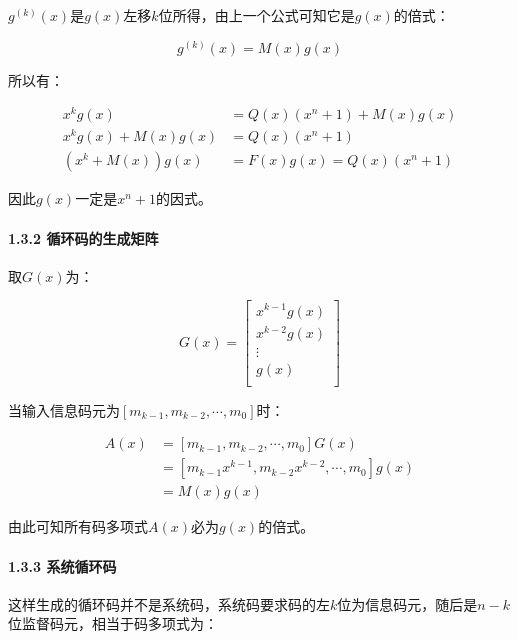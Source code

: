 \documentclass[
]{article}
\begin{document}
$g^{(k)}(x)$是$g(x)$左移$k$位所得，由上一个公式可知它是$g(x)$的倍式：

\begin{equation}
g^{(k)}(x)=M(x)g(x)
\end{equation}

所以有：

\begin{equation}
\begin{aligned}
x^kg(x)&=Q(x)(x^n+1)+M(x)g(x)\\
x^kg(x)+M(x)g(x)&=Q(x)(x^n+1)\\
(x^k+M(x))g(x)&=F(x)g(x)=Q(x)(x^n+1)
\end{aligned}
\end{equation}

因此$g(x)$一定是$x^n+1$的因式。

\hypertarget{header-n55}{%
\paragraph{1.3.2 循环码的生成矩阵}\label{header-n55}}

取$G(x)$为：

\begin{equation}
G(x)=
\left[
\begin{matrix}
x^{k-1}g(x)\\
x^{k-2}g(x)\\
 \vdots \\
g(x)\\
\end{matrix}
\right]
\end{equation}

当输入信息码元为$[m_{k-1},m_{k-2},\cdots,m_0]$时：

\begin{equation}
\begin{aligned}
A(x)&=[m_{k-1},m_{k-2},\cdots,m_0]G(x)\\
    &=[m_{k-1}x^{k-1},m_{k-2}x^{k-2},\cdots,m_0]g(x)\\
    &=M(x)g(x)
\end{aligned}
\end{equation}

由此可知所有码多项式$A(x)$必为$g(x)$的倍式。

\hypertarget{header-n61}{%
\paragraph{1.3.3 系统循环码}\label{header-n61}}

这样生成的循环码并不是系统码，系统码要求码的左$k$位为信息码元，随后是$n-k$位监督码元，相当于码多项式为：
\end{document}

